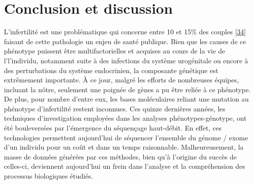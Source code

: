 \documentclass[12pt,a4paper,twoside]{ugathesis}
\theoremstyle{definition}
\theoremstyle{definition}
\theoremstyle{definition}
\theoremstyle{remark}
\begin{document}
\chapter*{Conclusion et discussion}\label{conclusion-et-discussion}

\newpage 

L'infertilité est une problématique qui concerne entre 10 et 15\% des
couples {[}\protect\hyperlink{ref-Boivin2007a}{34}{]} faisant de cette
pathologie un enjeu de santé publique. Bien que les causes de ce
phénotype puissent être multifactorielles et acquises au cours de la vie
de l'l'individu, notamment suite à des infections du système urogénitale
ou encore à des perturbations du système endocrinien, la composante
génétique est extrêmement importante. À ce jour, malgré les efforts de
nombreuses équipes, incluant la nôtre, seulement une poignée de gènes a
pu être reliée à ce phénotype. De plus, pour nombre d'entre eux, les
bases moléculaires reliant une mutation au phénotype d'infertilité
restent inconnues. Ces quinze dernières années, les techniques
d'investigation employées dans les analyses phénotypes-génotype, ont été
bouleversées par l'émergence du séquençage haut-débit. En effet, ces
technologies permettent aujourd'hui de séquencer l'ensemble du génome /
exome d'un individu pour un coût et dans un temps raisonnable.
Malheureusement, la masse de données générées par ces méthodes, bien
qu'à l'origine du succès de celles-ci, deviennent aujourd'hui un frein
dans l'analyse et la compréhension des processus biologiques étudiés.
\end{document}
